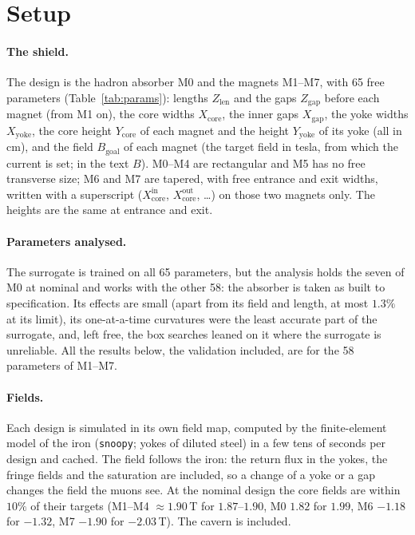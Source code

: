 \documentclass[11pt,a4paper]{article}
\begin{document}
\tableofcontents

\section{Setup}\label{sec:setup}

\paragraph{The shield.}
The design is the hadron absorber M0 and the magnets M1--M7, with 65 free parameters
(Table~\ref{tab:params}): lengths $Z_\mathrm{len}$ and the gaps $Z_\mathrm{gap}$ before each magnet
(from M1 on), the core widths $X_\mathrm{core}$, the inner gaps $X_\mathrm{gap}$, the yoke
widths $X_\mathrm{yoke}$, the core height $Y_\mathrm{core}$ of each magnet and the height
$Y_\mathrm{yoke}$ of its yoke (all in cm), and the field $B_\mathrm{goal}$ of each magnet (the
target field in tesla, from which the current is set; in the text $B$). M0--M4 are rectangular and
M5 has no free transverse size; M6 and M7 are tapered, with free entrance and exit widths, written
with a superscript ($X_\mathrm{core}^\mathrm{in}$, $X_\mathrm{core}^\mathrm{out}$, \dots) on
those two magnets only. The heights are the same at entrance and exit.

\paragraph{Parameters analysed.}
The surrogate is trained on all 65 parameters, but the analysis holds the seven of M0 at nominal
and works with the other 58: the absorber is taken as built to specification. Its effects are
small (apart from its field and length, at most $1.3\%$ at its limit), its one-at-a-time
curvatures were the least accurate part of the surrogate, and, left free, the box searches leaned
on it where the surrogate is unreliable. All the results below, the validation included, are for
the 58 parameters of M1--M7.
\paragraph{Fields.}
Each design is simulated in its own field map, computed by the finite-element model of the iron
(\texttt{snoopy}; yokes of diluted steel) in a few tens of seconds per design and cached. The
field follows the iron: the return flux in the yokes, the fringe fields and the saturation are
included, so a change of a yoke or a gap changes the field the muons see. At the nominal design
the core fields are within $10\%$ of their targets (M1--M4 $\approx1.90$\,T for $1.87$--$1.90$,
M0 $1.82$ for $1.99$, M6 $-1.18$ for $-1.32$, M7 $-1.90$ for $-2.03$\,T). The cavern is included.
\end{document}
